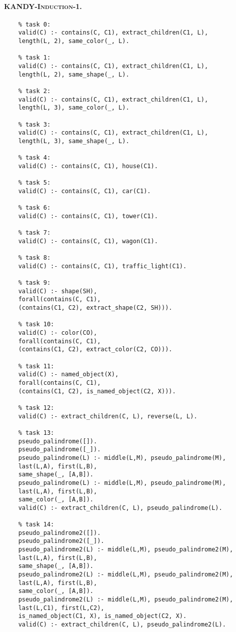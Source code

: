 \paragraph{\textsc{KANDY-Induction-1}.}


\begin{verbatim}
	% task 0:
	valid(C) :- contains(C, C1), extract_children(C1, L), 
	length(L, 2), same_color(_, L).
	
	% task 1:
	valid(C) :- contains(C, C1), extract_children(C1, L), 
	length(L, 2), same_shape(_, L).
	
	% task 2:
	valid(C) :- contains(C, C1), extract_children(C1, L), 
	length(L, 3), same_color(_, L).
	
	% task 3:
	valid(C) :- contains(C, C1), extract_children(C1, L), 
	length(L, 3), same_shape(_, L).
	
	% task 4:
	valid(C) :- contains(C, C1), house(C1).
	
	% task 5:
	valid(C) :- contains(C, C1), car(C1).
	
	% task 6:
	valid(C) :- contains(C, C1), tower(C1).
	
	% task 7:
	valid(C) :- contains(C, C1), wagon(C1).
	
	% task 8:
	valid(C) :- contains(C, C1), traffic_light(C1).
	
	% task 9:
	valid(C) :- shape(SH), 
	forall(contains(C, C1), 
	(contains(C1, C2), extract_shape(C2, SH))).
	
	% task 10:
	valid(C) :- color(CO), 
	forall(contains(C, C1), 
	(contains(C1, C2), extract_color(C2, CO))).
	
	% task 11:
	valid(C) :- named_object(X), 
	forall(contains(C, C1), 
	(contains(C1, C2), is_named_object(C2, X))).
	
	% task 12:
	valid(C) :- extract_children(C, L), reverse(L, L).
	
	% task 13:
	pseudo_palindrome([]).
	pseudo_palindrome([_]).
	pseudo_palindrome(L) :- middle(L,M), pseudo_palindrome(M),
	last(L,A), first(L,B), 
	same_shape(_, [A,B]).
	pseudo_palindrome(L) :- middle(L,M), pseudo_palindrome(M), 
	last(L,A), first(L,B), 
	same_color(_, [A,B]).
	valid(C) :- extract_children(C, L), pseudo_palindrome(L).
	
	% task 14:
	pseudo_palindrome2([]).
	pseudo_palindrome2([_]).
	pseudo_palindrome2(L) :- middle(L,M), pseudo_palindrome2(M),
	last(L,A), first(L,B), 
	same_shape(_, [A,B]).
	pseudo_palindrome2(L) :- middle(L,M), pseudo_palindrome2(M),
	last(L,A), first(L,B), 
	same_color(_, [A,B]).
	pseudo_palindrome2(L) :- middle(L,M), pseudo_palindrome2(M),
	last(L,C1), first(L,C2), 
	is_named_object(C1, X), is_named_object(C2, X).
	valid(C) :- extract_children(C, L), pseudo_palindrome2(L).
	

\end{verbatim}
